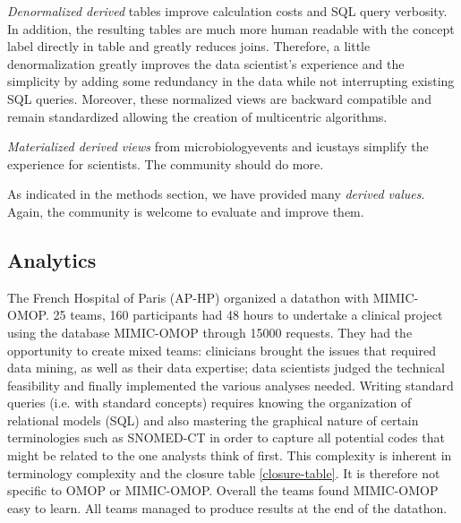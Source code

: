 \emph{Denormalized derived} tables improve calculation costs and SQL query verbosity. 
In addition, the resulting tables are much more human readable with the concept 
label directly in table and greatly reduces joins. Therefore, a little 
denormalization greatly improves the data scientist's experience and the simplicity
 by adding some redundancy in the data while not interrupting existing SQL queries. 
Moreover, these normalized views are backward compatible and remain 
standardized allowing the creation of multicentric algorithms.

\emph{Materialized derived views} from microbiologyevents and icustays simplify 
the experience for scientists. The community should do more.
                    
As indicated in the methods section, we have provided many \emph{derived values}. 
Again, the community is welcome to evaluate and improve them.   


\subsection{Analytics}
The French Hospital of Paris (AP-HP) organized a datathon with MIMIC-OMOP. 
25 teams, 160 participants had 48 hours to undertake a clinical project using 
the database MIMIC-OMOP through 15000 requests. They had the opportunity to 
create mixed teams: clinicians brought the issues that required data mining, 
as well as their data expertise; data scientists judged the technical feasibility 
and finally implemented the various analyses needed. Writing standard queries 
(i.e. with standard concepts) requires knowing the organization of relational models 
(SQL) and also mastering the graphical nature of certain terminologies such as 
SNOMED-CT in order to capture all potential codes that might be related to the one 
analysts think of first. This complexity is inherent in terminology complexity 
and the closure table \ref{closure-table}. It is therefore not specific to OMOP 
or MIMIC-OMOP. 
Overall the teams found MIMIC-OMOP easy to learn.
All teams managed to produce results at the end of the datathon.
